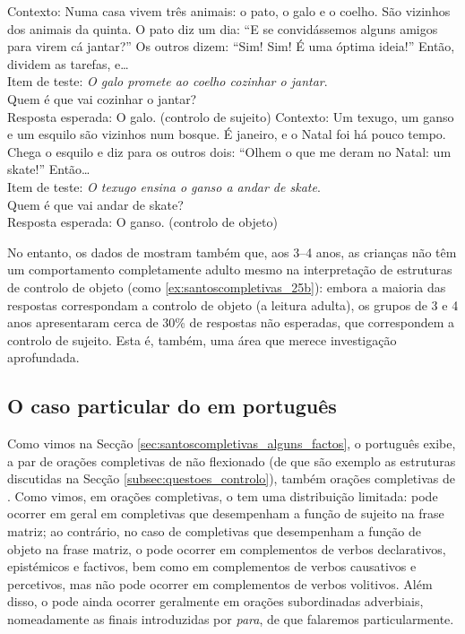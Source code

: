 \documentclass[output=paper]{LSP/langsci}
\begin{document}
\ea\label{ex:santoscompletivas_25}
\ea\label{ex:santoscompletivas_25a} Contexto: Numa casa vivem três animais: o pato, o galo e o coelho. São vizinhos dos animais da quinta. O pato diz um dia: ``E se convidássemos alguns amigos para virem cá jantar?'' Os outros dizem: ``Sim! Sim! É uma óptima ideia!'' Então, dividem as tarefas, e\ldots\\
Item de teste: \textit{O galo promete ao coelho cozinhar o jantar}.\\
Quem é que vai cozinhar o jantar?\\
Resposta esperada: O galo. (controlo de sujeito)
\ex\label{ex:santoscompletivas_25b} Contexto: Um texugo, um ganso e um esquilo são vizinhos num bosque. É janeiro, e o Natal foi há pouco tempo. Chega o esquilo e diz para os outros dois: ``Olhem o que me deram no Natal: um skate!'' Então\ldots\\
Item de teste: \textit{O texugo ensina o ganso a andar de skate}.\\
Quem é que vai andar de skate?\\
Resposta esperada: O ganso. (controlo de objeto)
\zl

No entanto, os dados de \citet{agostinho2014} mostram também que, aos 3--4 anos, as crianças não têm um comportamento completamente adulto mesmo na interpretação de estruturas de controlo de objeto (como \ref{ex:santoscompletivas_25b}): embora a maioria das respostas correspondam a controlo de objeto (a leitura adulta), os grupos de 3 e 4 anos apresentaram cerca de 30\% de respostas não esperadas, que correspondem a controlo de sujeito. Esta é, também, uma área que merece investigação aprofundada.

\subsection{O caso particular do  em português}
\label{subsec:santoscompletivas_caso_particular}

Como vimos na Secção \ref{sec:santoscompletivas_alguns_factos}, o português exibe, a par de orações completivas de  não flexionado (de que são exemplo as estruturas discutidas na Secção \ref{subsec:questoes_controlo}), também orações completivas de . Como vimos, em orações completivas, o  tem uma distribuição limitada: pode ocorrer em geral em completivas que desempenham a função de sujeito na frase matriz; ao contrário, no caso de completivas que desempenham a função de objeto na frase matriz, o  pode ocorrer em complementos de verbos declarativos, epistémicos e factivos, bem como em complementos de verbos causativos e percetivos, mas não pode ocorrer em complementos de verbos volitivos. Além disso, o  pode ainda ocorrer geralmente em orações subordinadas adverbiais, nomeadamente as finais introduzidas por \textit{para}, de que falaremos particularmente.
\end{document}

